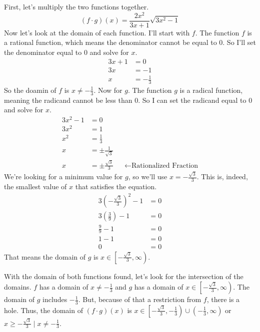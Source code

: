 \begin{solution}
    First, let's multiply the two functions together.
    \[
        (f \cdot g)(x) = \frac{2x^2}{3x + 1}\sqrt{3x^2 - 1}
    \]
    Now let's look at the domain of each function. I'll start with $f$. The function $f$ is a rational function, which means the denominator cannot be equal to $0$. So I'll set the denominator equal to $0$ and solve for $x$.
    \begin{align*}
    3x + 1 &= 0 \\
    3x &= -1 \\
    x &= -\frac{1}{3}
    \end{align*}
    So the doamin of $f$ is $x \neq -\frac{1}{3}$. 
    \clearpage
    Now for $g$. The function $g$ is a radical function, meaning the radicand cannot be less than $0$. So I can set the radicand equal to $0$ and solve for $x$.
    \begin{align*}
        3x^2 - 1 &= 0 \\
        3x^2 &= 1 \\
        x^2 &= \frac{1}{3} \\
        x &= \pm \frac{1}{\sqrt{3}} \\
        x &= \pm \frac{\sqrt{3}}{3} && \longleftarrow \text{Rationalized Fraction}
    \end{align*}
    We're looking for a minimum value for $g$, so we'll use $x = -\frac{\sqrt{3}}{3}$. This is, indeed, the smallest value of $x$ that satisfies the equation.
    \begin{align*}
        3\left(-\frac{\sqrt{3}}{3}\right)^2 - 1 &= 0 \\
        3\left(\frac{3}{9} \right) - 1 &= 0 \\
        \frac{9}{9} - 1 &= 0 \\
        1 - 1 &= 0 \\
        0 &= 0
    \end{align*}
    That means the domain of $g$ is $x \in \left[-\frac{\sqrt{3}}{3}, \infty \right)$.

    With the domain of both functions found, let's look for the intersection of the domains. $f$ has a domain of $x \neq -\frac{1}{3}$ and $g$ has a domain of $x \in \left[-\frac{\sqrt{3}}{3}, \infty \right)$. The domain of $g$ includes $-\frac{1}{3}$. But, because of that a restriction from $f$, there is a hole. Thus, the domain of $(f \cdot g)(x)$ is $x\in \left[-\frac{\sqrt{3}}{3}, -\frac{1}{3} \right) \cup \left(-\frac{1}{3}, \infty \right)$ or $x \ge -\frac{\sqrt{3}}{3} \mid x \neq -\frac{1}{3}$.
\end{solution}